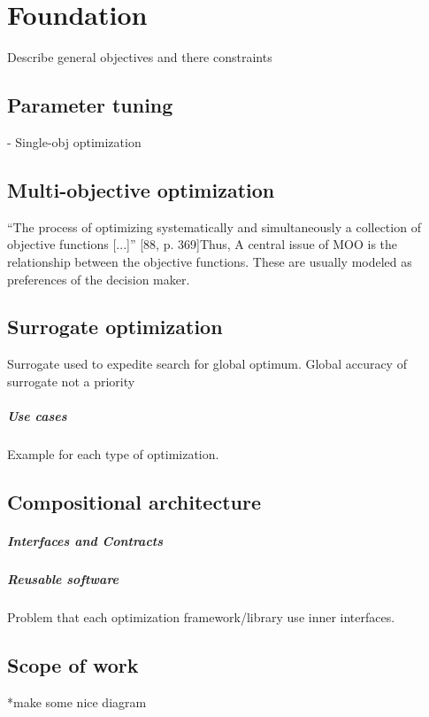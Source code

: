 \chapter{Foundation}
    Describe general objectives and there constraints

    \section{Parameter tuning}
    - Single-obj optimization
    
    \section{Multi-objective optimization}
    “The process of optimizing systematically and simultaneously a collection of objective functions [...]” [88, p. 369]Thus,
    A central issue of MOO is the relationship between the objective functions. These are usually modeled as preferences of the decision maker.

    \section{Surrogate optimization}
    Surrogate used to expedite search for global optimum. Global accuracy of surrogate
    not a priority

    \paragraph{Use cases}
    Example for each type of optimization.

    \section{Compositional architecture}
        \paragraph{Interfaces and Contracts}

        \paragraph{Reusable software}
        Problem that each optimization framework/library use inner interfaces. 

    \section{Scope of work}
        *make some nice diagram